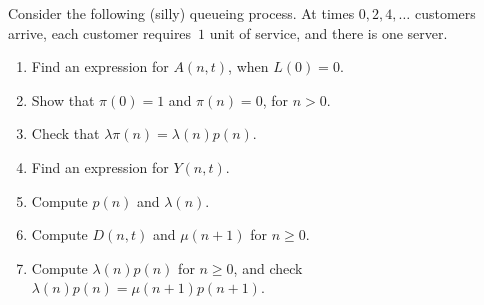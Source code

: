 \documentclass[stochastic-or.tex]{subfiles}
\begin{document}
\begin{exercise} \label{ex:111}
Consider the following (silly) queueing process.
At times $0, 2,4, \ldots$ customers arrive, each customer requires~$1$ unit of service, and there is one server.
 \begin{enumerate}
 \item  Find an expression for $A(n,t)$, when $L(0)=0$.
 \item Show that $\pi(0)=1$ and $\pi(n)=0$, for $n>0$.
 \item Check that $\lambda \pi(n) = \lambda(n) p(n)$.
 \item  Find an expression for $Y(n,t)$.
 \item Compute $p(n)$ and $\lambda(n)$.
 \item Compute $D(n,t)$ and $\mu(n+1)$ for $n\geq 0$.
 \item Compute $\lambda(n) p(n)$ for $n\geq 0$, and check $\lambda(n) p(n) = \mu(n+1) p(n+1)$.
 \end{enumerate}


\end{exercise}
\end{document}
